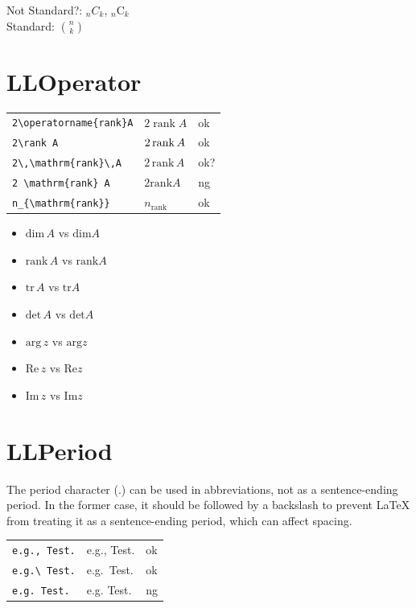 \documentclass[a4paper]{article}
\newcommand{\tA}[1]{\textcolor{cA}{#1}}
\newcommand{\tC}[1]{\textcolor{cC}{#1}}
\newcommand{\tD}[1]{\textcolor{cD}{#1}}
\begin{document}
Not Standard?: \({}_n C_k\), \({}_n \mathrm{C}_k\)\\
Standard: \(\binom{n}{k}\)

\section{LLOperator}

\begin{table}[H]
	\centering
	\begin{tabular}{lll}
		\verb|2\operatorname{rank}A| & $2\operatorname{rank}A$ & \tA{ok}  \\
		\verb|2\rank A|              & $2\rank A$              & \tA{ok}  \\
		\verb|2\,\mathrm{rank}\,A|   & $2\,\mathrm{rank}\,A$   & \tC{ok?} \\
		\verb|2 \mathrm{rank} A|     & $2  \mathrm{rank}  A$   & \tD{ng}  \\
		\verb|n_{\mathrm{rank}}|     & $n_{\mathrm{rank}}$     & \tA{ok}  \\
	\end{tabular}
\end{table}

\begin{itemize}
	\item $\mathrm{dim}\,A$ vs $\mathrm{dim} A$
	\item $\mathrm{rank}\,A$ vs $\mathrm{rank} A$
	\item $\mathrm{tr}\,A$ vs $\mathrm{tr} A$
	\item $\mathrm{det}\,A$ vs $\mathrm{det} A$
	\item $\mathrm{arg}\,z$ vs $\mathrm{arg} z$
	\item $\mathrm{Re}\,z$ vs $\mathrm{Re} z$
	\item $\mathrm{Im}\,z$ vs $\mathrm{Im} z$
\end{itemize}

\section{LLPeriod}

The period character (.) can be used in abbreviations, not as a sentence-ending period. In the former case, it should be followed by a backslash to prevent LaTeX from treating it as a sentence-ending period, which can affect spacing.

\begin{table}[H]
	\centering
	\begin{tabular}{lll}
		\verb|e.g., Test.| & e.g., Test. & \tA{ok} \\
		\verb|e.g.\ Test.| & e.g.\ Test. & \tA{ok} \\
		\verb|e.g. Test.|  & e.g. Test.  & \tD{ng} \\
	\end{tabular}
\end{table}
\end{document}
